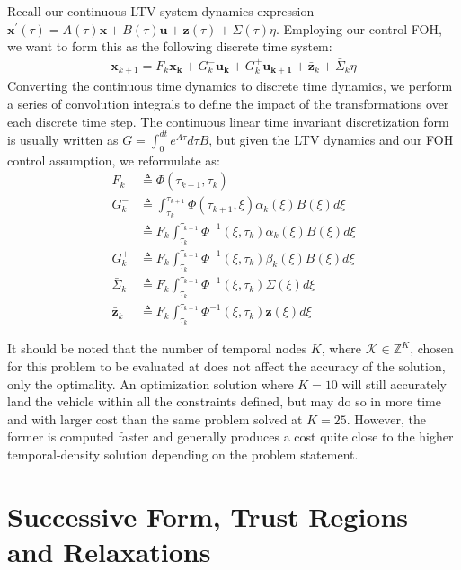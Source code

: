 Recall our continuous LTV system dynamics expression $\mathbf{x}^\prime(\tau) =  A(\tau)\mathbf{x} + B(\tau)\mathbf{u} + \mathbf{z}(\tau) + \Sigma(\tau)\eta$. Employing our control FOH, we want to form this as the following discrete time system:
\begin{align}
	\mathbf{x}_{k+1} = F_k\mathbf{x_k} + G^-_k\mathbf{u_k} + G^+_k\mathbf{u_{k+1}} + \bar{\mathbf{z}}_k + \bar{\Sigma}_k\eta
\end{align}
Converting the continuous time dynamics to discrete time dynamics, we perform a series of convolution integrals to define the impact of the transformations over each discrete time step. The continuous linear time invariant discretization form is usually written as $G=\int_{0}^{dt} e^{A \tau} d \tau B$, but given the LTV dynamics and our FOH control assumption, we reformulate as:
%
\begin{subequations}
\label{disc}
 \begin{align}
 F_k &\triangleq  \Phi(\tau_{k+1},\tau_k)\\
 G^-_k &\triangleq \int_{\tau_k}^{\tau_{k+1}}  \Phi(\tau_{k+1},\xi) \alpha_k(\xi)B(\xi) d\xi\\
 &\triangleq F_k \int_{\tau_k}^{\tau_{k+1}}  \Phi^{-1}(\xi,\tau_{k}) \alpha_k(\xi)B(\xi) d\xi\\
 G^+_k &\triangleq F_k \int_{\tau_k}^{\tau_{k+1}}  \Phi^{-1}(\xi,\tau_{k}) \beta_k(\xi)B(\xi) d\xi\\
 \bar{\Sigma}_k &\triangleq  F_k \int_{\tau_k}^{\tau_{k+1}} \Phi^{-1}(\xi,\tau_{k}) \Sigma(\xi) d\xi\\
 \bar{\mathbf{z}}_k &\triangleq F_k \int_{\tau_k}^{\tau_{k+1}} \Phi^{-1}(\xi,\tau_{k}) \mathbf{z}(\xi) d\xi
\end{align}
\end{subequations}

It should be noted that the number of temporal nodes $K$, where $\mathcal{K} \in \mathbb{Z}^K$, chosen for this problem to be evaluated at does not affect the accuracy of the solution, only the optimality. An optimization solution where $K=10$ will still accurately land the vehicle within all the constraints defined, but may do so in more time and with larger cost than the same problem solved at $K=25$. However, the former is computed faster and generally produces a cost quite close to the higher temporal-density solution depending on the problem statement.

\section{Successive Form, Trust Regions and Relaxations}

